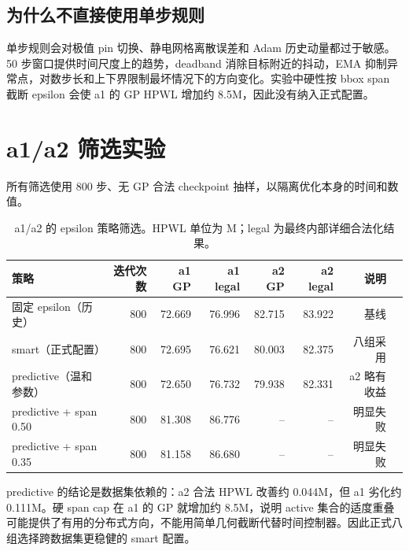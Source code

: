 \documentclass[11pt,a4paper]{ctexart}
\begin{document}
\subsection{为什么不直接使用单步规则}
单步规则会对极值 pin 切换、静电网格离散误差和 Adam 历史动量都过于敏感。50 步窗口提供时间尺度上的趋势，deadband 消除目标附近的抖动，EMA 抑制异常点，对数步长和上下界限制最坏情况下的方向变化。实验中硬性按 bbox span 截断 epsilon 会使 a1 的 GP HPWL 增加约 8.5M，因此没有纳入正式配置。

\section{a1/a2 筛选实验}

所有筛选使用 800 步、无 GP 合法 checkpoint 抽样，以隔离优化本身的时间和数值。

\begin{table}[H]
\centering
\small
\caption{a1/a2 的 epsilon 策略筛选。HPWL 单位为 M；legal 为最终内部详细合法化结果。}
\begin{tabular}{lrrrrrrr}
\toprule
策略 & 迭代次数 & a1 GP & a1 legal & a2 GP & a2 legal & 说明\\
\midrule
固定 epsilon（历史） & 800 & 72.669 & 76.996 & 82.715 & 83.922 & 基线\\
smart（正式配置） & 800 & 72.695 & 76.621 & 80.003 & 82.375 & 八组采用\\
predictive（温和参数） & 800 & 72.650 & 76.732 & 79.938 & 82.331 & a2 略有收益\\
predictive + span 0.50 & 800 & 81.308 & 86.776 & -- & -- & 明显失败\\
predictive + span 0.35 & 800 & 81.158 & 86.680 & -- & -- & 明显失败\\
\bottomrule
\end{tabular}
\end{table}

predictive 的结论是数据集依赖的：a2 合法 HPWL 改善约 0.044M，但 a1 劣化约 0.111M。硬 span cap 在 a1 的 GP 就增加约 8.5M，说明 active 集合的适度重叠可能提供了有用的分布式方向，不能用简单几何截断代替时间控制器。因此正式八组选择跨数据集更稳健的 smart 配置。
\end{document}
